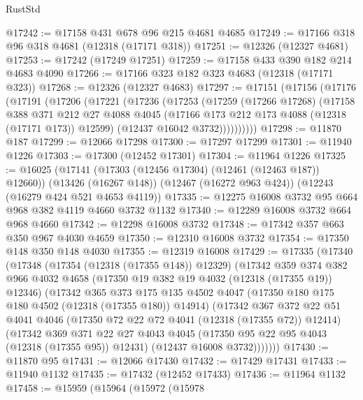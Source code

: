 \begin{lexlean}{RustStd}
\begin{coremodule}
@17242 := @17158 @431 @678 @96 @215 @4681 @4685
@17249 := @17166 @318 @96 @318 @4681 (@12318 (@17171 @318))
@17251 := @12326 (@12327 @4681)
@17253 := @17242 (@17249 @17251)
@17259 := @17158 @433 @390 @182 @214 @4683 @4090
@17266 := @17166 @323 @182 @323 @4683 (@12318 (@17171 @323))
@17268 := @12326 (@12327 @4683)
@17297 := @17151
    (@17156
      (@17176
        (@17191
          (@17206
            (@17221
              (@17236
                (@17253
                  (@17259
                    (@17266 @17268)
                    (@17158
                      @388
                      @371
                      @212
                      @27
                      @4088
                      @4045
                      (@17166 @173 @212 @173 @4088 (@12318 (@17171 @173)) @12599)
                      (@12437 @16042 @3732))))))))))
@17298 := @11870 @187
@17299 := @12066 @17298
@17300 := @17297 @17299
@17301 := @11940 @1226
@17303 := @17300 (@12452 @17301)
@17304 := @11964 @1226
@17325 := @16025
    (@17141 (@17303 (@12456 @17304) (@12461 (@12463 @187)) @12660))
    (@13426 (@16267 @148))
    (@12467 (@16272 @963 @424))
    (@12243 (@16279 @424 @521 @4653 @4119))
@17335 := @12275 @16008 @3732 @95 @664 @968 @382 @4119 @4660 @3732 @1132
@17340 := @12289 @16008 @3732 @664 @968 @4660
@17342 := @12298 @16008 @3732
@17348 := @17342 @357 @663 @350 @967 @4030 @4659
@17350 := @12310 @16008 @3732
@17354 := @17350 @148 @350 @148 @4030
@17355 := @12319 @16008
@17429 := @17335
    (@17340
      (@17348
        (@17354 (@12318 (@17355 @148)) @12329)
        (@17342
          @359
          @374
          @382
          @966
          @4032
          @4658
          (@17350 @19 @382 @19 @4032 (@12318 (@17355 @19)) @12346)
          (@17342
            @365
            @373
            @175
            @135
            @4502
            @4047
            (@17350 @180 @175 @180 @4502 (@12318 (@17355 @180)) @14914)
            (@17342
              @367
              @372
              @22
              @51
              @4041
              @4046
              (@17350 @72 @22 @72 @4041 (@12318 (@17355 @72)) @12414)
              (@17342
                @369
                @371
                @22
                @27
                @4043
                @4045
                (@17350 @95 @22 @95 @4043 (@12318 (@17355 @95)) @12431)
                (@12437 @16008 @3732)))))))
@17430 := @11870 @95
@17431 := @12066 @17430
@17432 := @17429 @17431
@17433 := @11940 @1132
@17435 := @17432 (@12452 @17433)
@17436 := @11964 @1132
@17458 := @15959
    (@15964
      (@15972
        (@15978

\end{coremodule}
\end{lexlean}
